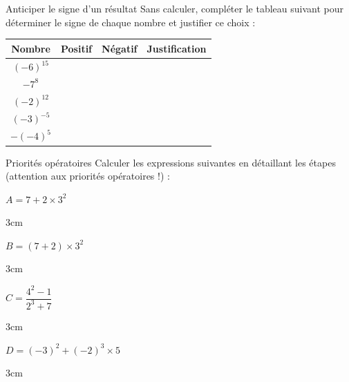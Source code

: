 \documentclass[a4paper]{book}
\begin{document}
    \begin{exercice}{Anticiper le signe d'un résultat}
    Sans calculer, compléter le tableau suivant pour déterminer le signe de chaque nombre et justifier ce choix :
    
    \vspace{0.2cm}
    \begin{center}
    \renewcommand{\arraystretch}{2.3}
    \begin{tabularx}{\textwidth}{|c|c|c|X|}
    \hline
    \textbf{Nombre} & \textbf{Positif} & \textbf{Négatif} & \textbf{Justification} \\
    \hline
    $(-6)^{15}$ & & & \\
    \hline
    $-7^8$ & & & \\
    \hline
    $(-2)^{12}$ & & & \\
    \hline
    $(-3)^{-5}$ & & & \\
    \hline
    $-(-4)^5$ & & & \\
    \hline
    \end{tabularx}
    \renewcommand{\arraystretch}{1}
    \end{center}
    \end{exercice}
    
    \newpage
    
    \begin{exercice}{Priorités opératoires}
    Calculer les expressions suivantes en détaillant les étapes (attention aux priorités opératoires !) :
    
    \noindent
    \begin{minipage}[t]{0.48\textwidth}
        $A = 7 + 2 \times 3^2$ \\
        \begin{ZoneReponse}{3cm}\end{ZoneReponse}
    \end{minipage}\hfill
    \begin{minipage}[t]{0.48\textwidth}
        $B = (7 + 2) \times 3^2$ \\
        \begin{ZoneReponse}{3cm}\end{ZoneReponse}
    \end{minipage}
    
    \noindent
    \begin{minipage}[t]{0.48\textwidth}
        $C = \dfrac{4^2 - 1}{2^3 + 7}$ \\
        \begin{ZoneReponse}{3cm}\end{ZoneReponse}
    \end{minipage}\hfill
    \begin{minipage}[t]{0.48\textwidth}
        $D = (-3)^2 + (-2)^3 \times 5$ \\
        \begin{ZoneReponse}{3cm}\end{ZoneReponse}
    \end{minipage}
    \end{exercice}
    
\end{document}
